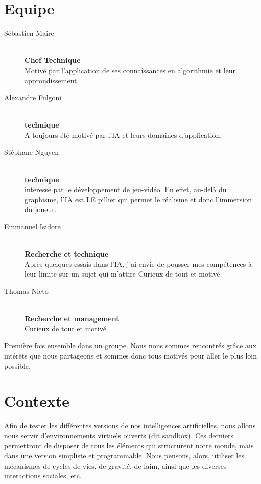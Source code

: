 \documentclass[a4paper]{report}
\begin{document}
  \section*{Equipe}
    \begin{description}
      \item[Sébastien Maire] \hfill \\
        \textbf{Chef Technique} \\
        Motivé par l'application de ses connaîssances en algorithmie et leur approndissement
      \item[Alexandre Fulgoni] \hfill \\
        \textbf{technique} \\
        A toujours été motivé par l'IA et leurs domaines d'application.
      \item[Stéphane Nguyen] \hfill \\
        \textbf{technique} \\
        intéressé par le développement de jeu-vidéo. En effet,
        au-delà du graphisme, l’IA est LE pillier qui permet le réalisme
        et donc l’immersion du joueur.
      \item[Emmanuel Isidore] \hfill \\
        \textbf{Recherche et technique} \\
       Après quelques essais dans l'IA, j'ai envie de pousser mes comp\'etences à leur limite sur un sujet qui m'attire
        Curieux de tout et motivé.
      \item[Thomas Nieto] \hfill \\
        \textbf{Recherche et management} \\
        Curieux de tout et motivé.
    \end{description}

  \noindent
  Première fois ensemble dans un groupe. Nous nous sommes rencontrés grâce aux
  intérêts que nous partageons et sommes donc tous motivés pour aller le plus
  loin possible.

  \section*{Contexte}
  Afin de tester les différentes versions de nos intelligences artificielles, nous allons nous servir d'environnements virtuels ouverts (dit sandbox).
  Ces derniers permettront de disposer de tous les éléments qui structurent notre monde, mais dans une version simpliste et programmable.
  Nous pensons, alors, utiliser les mécanismes de cycles de vies, de gravité, de faim, ainsi que les diverses interactions sociales, etc.
\end{document}
